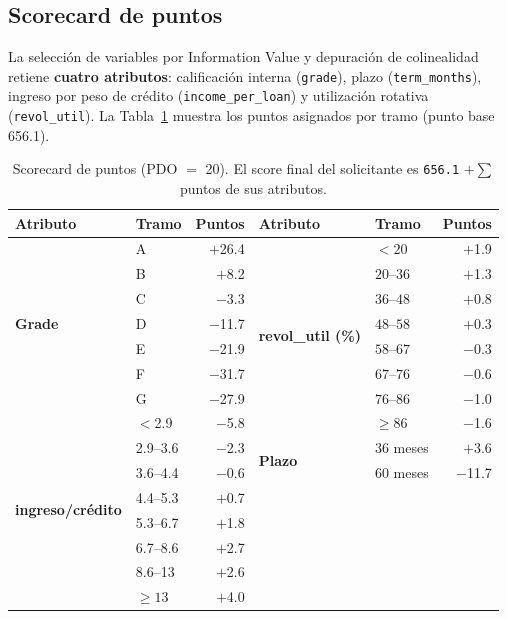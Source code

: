 \documentclass[11pt, letterpaper]{article}
\newcommand{\bt}[1]{\textbf{#1}}
\begin{document}
\subsection{Scorecard de puntos}

La selección de variables por Information Value y depuración de colinealidad
retiene \bt{cuatro atributos}: calificación interna (\texttt{grade}), plazo
(\texttt{term\_months}), ingreso por peso de crédito
(\texttt{income\_per\_loan}) y utilización rotativa (\texttt{revol\_util}).
La Tabla~\ref{tab:puntos} muestra los puntos asignados por tramo (punto base
656.1).

\begin{table}[H]
  \centering
  \caption{Scorecard de puntos (PDO $=$ 20). El score final del solicitante es
           \texttt{656.1} $+ \sum$ puntos de sus atributos.}
  \label{tab:puntos}
  \small
  \begin{tabular}{llrllr}
    \toprule
    \bt{Atributo} & \bt{Tramo} & \bt{Puntos} & \bt{Atributo} & \bt{Tramo} & \bt{Puntos} \\
    \midrule
    \multirow{7}{*}{\bt{Grade}} & A  & $+$26.4 & \multirow{8}{*}{\bt{revol\_util (\%)}} & $<20$   & $+$1.9 \\
    & B  & $+$8.2  & & $20$--$36$ & $+$1.3 \\
    & C  & $-$3.3  & & $36$--$48$ & $+$0.8 \\
    & D  & $-$11.7 & & $48$--$58$ & $+$0.3 \\
    & E  & $-$21.9 & & $58$--$67$ & $-$0.3 \\
    & F  & $-$31.7 & & $67$--$76$ & $-$0.6 \\
    & G  & $-$27.9 & & $76$--$86$ & $-$1.0 \\
    \midrule
    \multirow{8}{*}{\bt{ingreso/crédito}} & $<$2.9   & $-$5.8 & & $\geq 86$ & $-$1.6 \\
    & 2.9--3.6 & $-$2.3 & \multirow{2}{*}{\bt{Plazo}} & 36 meses  & $+$3.6 \\
    & 3.6--4.4 & $-$0.6 &                      & 60 meses  & $-$11.7 \\
    & 4.4--5.3 & $+$0.7 & & & \\
    & 5.3--6.7 & $+$1.8 & & & \\
    & 6.7--8.6 & $+$2.7 & & & \\
    & 8.6--13  & $+$2.6 & & & \\
    & $\geq 13$ & $+$4.0 & & & \\
    \bottomrule
  \end{tabular}
\end{table}
\end{document}
